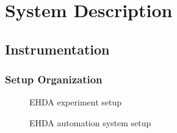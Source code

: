 \chapter[System Description]{System Description}
\label{chap:descricaoproblema}





\section{Instrumentation}
\label{sec:instrumentation}

\subsection{Setup Organization}
\label{subsec:setup_organization}


\begin{figure}[H]
  \centering
  \caption{EHDA experiment setup \cite{Luewton}}
  \label{fig:ehda_setup}
\end{figure}


\begin{figure}[H]
  \centering
  \caption{EHDA automation system setup}
  \label{fig:setup_pic}
\end{figure}


